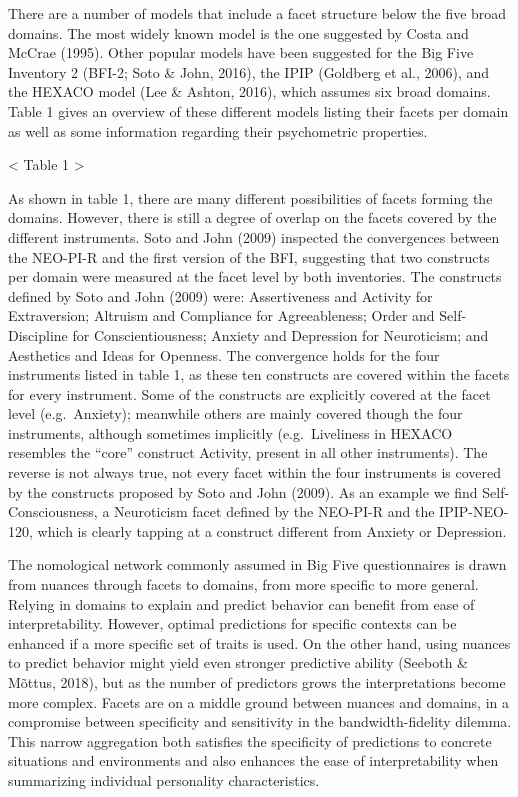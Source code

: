 \documentclass[man]{apa6}
\theoremstyle{definition}
\theoremstyle{definition}
\theoremstyle{definition}
\theoremstyle{remark}
\begin{document}
There are a number of models that include a facet structure below the
five broad domains. The most widely known model is the one suggested by
Costa and McCrae (1995). Other popular models have been suggested for
the Big Five Inventory 2 (BFI-2; Soto \& John, 2016), the IPIP (Goldberg
et al., 2006), and the HEXACO model (Lee \& Ashton, 2016), which assumes
six broad domains. Table 1 gives an overview of these different models
listing their facets per domain as well as some information regarding
their psychometric properties.

\textless{} Table 1 \textgreater{}

As shown in table 1, there are many different possibilities of facets
forming the domains. However, there is still a degree of overlap on the
facets covered by the different instruments. Soto and John (2009)
inspected the convergences between the NEO-PI-R and the first version of
the BFI, suggesting that two constructs per domain were measured at the
facet level by both inventories. The constructs defined by Soto and John
(2009) were: Assertiveness and Activity for Extraversion; Altruism and
Compliance for Agreeableness; Order and Self-Discipline for
Conscientiousness; Anxiety and Depression for Neuroticism; and
Aesthetics and Ideas for Openness. The convergence holds for the four
instruments listed in table 1, as these ten constructs are covered
within the facets for every instrument. Some of the constructs are
explicitly covered at the facet level (e.g.~Anxiety); meanwhile others
are mainly covered though the four instruments, although sometimes
implicitly (e.g.~Liveliness in HEXACO resembles the \enquote{core}
construct Activity, present in all other instruments). The reverse is
not always true, not every facet within the four instruments is covered
by the constructs proposed by Soto and John (2009). As an example we
find Self-Consciousness, a Neuroticism facet defined by the NEO-PI-R and
the IPIP-NEO-120, which is clearly tapping at a construct different from
Anxiety or Depression.

The nomological network commonly assumed in Big Five questionnaires is
drawn from nuances through facets to domains, from more specific to more
general. Relying in domains to explain and predict behavior can benefit
from ease of interpretability. However, optimal predictions for specific
contexts can be enhanced if a more specific set of traits is used. On
the other hand, using nuances to predict behavior might yield even
stronger predictive ability (Seeboth \& Mõttus, 2018), but as the number
of predictors grows the interpretations become more complex. Facets are
on a middle ground between nuances and domains, in a compromise between
specificity and sensitivity in the bandwidth-fidelity dilemma. This
narrow aggregation both satisfies the specificity of predictions to
concrete situations and environments and also enhances the ease of
interpretability when summarizing individual personality
characteristics.
\end{document}
